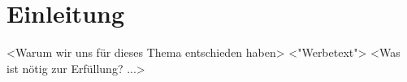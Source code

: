 \section{Einleitung}
<Warum wir uns für dieses Thema entschieden haben>
<"Werbetext">
<Was ist nötig zur Erfüllung? ...>